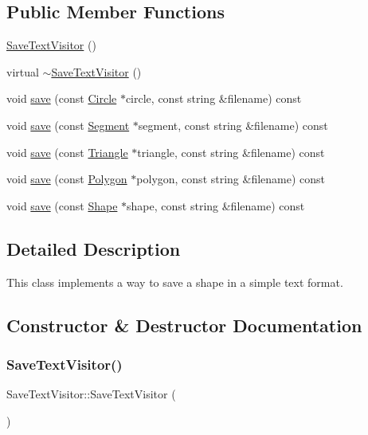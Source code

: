 \subsection*{Public Member Functions}
\begin{DoxyCompactItemize}
\item 
\hyperlink{class_save_text_visitor_ae1ae492c0dd3eb6f26f4981a871d1130}{Save\+Text\+Visitor} ()
\item 
virtual \hyperlink{class_save_text_visitor_a1939db020915adce6354cc168cd1be3e}{$\sim$\+Save\+Text\+Visitor} ()
\item 
void \hyperlink{class_save_text_visitor_a2f083ffe6cda82e0c2fd31d601ba5e30}{save} (const \hyperlink{class_circle}{Circle} $\ast$circle, const string \&filename) const
\item 
void \hyperlink{class_save_text_visitor_aded2d7fe5898a3fd55bf4d15ed405416}{save} (const \hyperlink{class_segment}{Segment} $\ast$segment, const string \&filename) const
\item 
void \hyperlink{class_save_text_visitor_a1ac892a59b374572d44fc69b9b3528c0}{save} (const \hyperlink{class_triangle}{Triangle} $\ast$triangle, const string \&filename) const
\item 
void \hyperlink{class_save_text_visitor_a9b4292ce11779caf26556cf6abc5db0f}{save} (const \hyperlink{class_polygon}{Polygon} $\ast$polygon, const string \&filename) const
\item 
void \hyperlink{class_save_text_visitor_aa73d6b9e27e6b95d058c089fb4900514}{save} (const \hyperlink{class_shape}{Shape} $\ast$shape, const string \&filename) const
\end{DoxyCompactItemize}


\subsection{Detailed Description}
This class implements a way to save a shape in a simple text format. 

\subsection{Constructor \& Destructor Documentation}
\hypertarget{class_save_text_visitor_ae1ae492c0dd3eb6f26f4981a871d1130}{}\label{class_save_text_visitor_ae1ae492c0dd3eb6f26f4981a871d1130} 
\subsubsection{\texorpdfstring{Save\+Text\+Visitor()}{SaveTextVisitor()}}
{\footnotesize\ttfamily Save\+Text\+Visitor\+::\+Save\+Text\+Visitor (\begin{DoxyParamCaption}{ }\end{DoxyParamCaption})}

